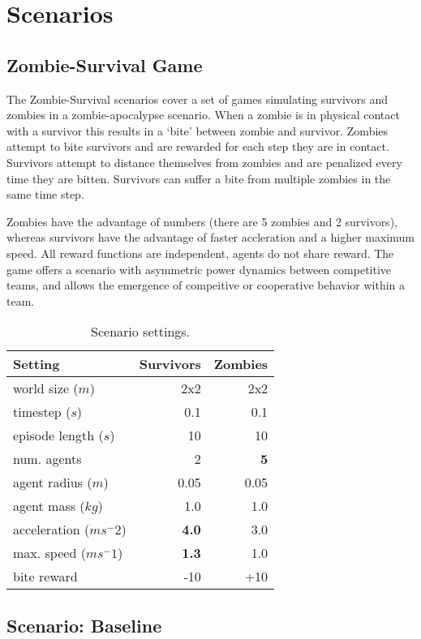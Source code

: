 \documentclass[11pt,a4paper]{article}
\begin{document}
\section{Scenarios}
\label{sec:scenarios}

\subsection{Zombie-Survival Game}
\label{sec:game}

The Zombie-Survival scenarios cover a set of games simulating survivors and zombies in a zombie-apocalypse scenario.
When a zombie is in physical contact with a survivor this results in a `bite' between zombie and survivor.
Zombies attempt to bite survivors and are rewarded for each step they are in contact.
Survivors attempt to distance themselves from zombies and are penalized every time they are bitten.
Survivors can suffer a bite from multiple zombies in the same time step.

Zombies have the advantage of numbers (there are 5 zombies and 2 survivors), whereas survivors have the advantage of faster accleration and a higher maximum speed.
All reward functions are independent, agents do not share reward.
The game offers a scenario with asymmetric power dynamics between competitive teams, and allows the emergence of compeitive or cooperative behavior within a team.

\begin{table}
\centering
\begin{tabular}{lrr}
\hline \textbf{Setting} & \textbf{Survivors} & \textbf{Zombies} \\ \hline
  world size ($m$) & 2x2 & 2x2 \\
  timestep ($s$) & 0.1 & 0.1 \\
  episode length ($s$) & 10 & 10 \\
  num. agents & 2 & \textbf{5} \\
  agent radius ($m$) & 0.05 & 0.05 \\
  agent mass ($kg$) & 1.0 & 1.0 \\
  acceleration ($ms^-2$) & \textbf{4.0} & 3.0 \\
  max. speed ($ms^-1$) & \textbf{1.3} & 1.0 \\
  bite reward & -10 & +10 \\
\hline
\end{tabular}
\caption{\label{game-settings} Scenario settings. }
\end{table}

\subsection{Scenario: Baseline}
\label{sec:baseline}
\end{document}
